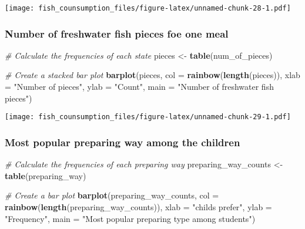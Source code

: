 \documentclass[
]{article}
\newenvironment{Shaded}{\begin{snugshade}}{\end{snugshade}}
\newcommand{\AttributeTok}[1]{\textcolor[rgb]{0.13,0.29,0.53}{#1}}
\newcommand{\CommentTok}[1]{\textcolor[rgb]{0.56,0.35,0.01}{\textit{#1}}}
\newcommand{\FunctionTok}[1]{\textcolor[rgb]{0.13,0.29,0.53}{\textbf{#1}}}
\newcommand{\NormalTok}[1]{#1}
\newcommand{\OtherTok}[1]{\textcolor[rgb]{0.56,0.35,0.01}{#1}}
\newcommand{\StringTok}[1]{\textcolor[rgb]{0.31,0.60,0.02}{#1}}
\begin{document}
\texttt{[image: fish\_counsumption\_files/figure-latex/unnamed-chunk-28-1.pdf]}

\hypertarget{number-of-freshwater-fish-pieces-foe-one-meal}{%
\subsubsection{Number of freshwater fish pieces foe one
meal}\label{number-of-freshwater-fish-pieces-foe-one-meal}}

\begin{Shaded}
\begin{Highlighting}[]
\CommentTok{\# Calculate the frequencies of each state}
\NormalTok{pieces }\OtherTok{\textless{}{-}} \FunctionTok{table}\NormalTok{(num\_of\_pieces)}

\CommentTok{\# Create a stacked bar plot}
\FunctionTok{barplot}\NormalTok{(pieces, }\AttributeTok{col =} \FunctionTok{rainbow}\NormalTok{(}\FunctionTok{length}\NormalTok{(pieces)), }
        \AttributeTok{xlab =} \StringTok{"Number of pieces"}\NormalTok{, }\AttributeTok{ylab =} \StringTok{"Count"}\NormalTok{, }\AttributeTok{main =} \StringTok{"Number of freshwater fish pieces"}\NormalTok{)}
\end{Highlighting}
\end{Shaded}

\texttt{[image: fish\_counsumption\_files/figure-latex/unnamed-chunk-29-1.pdf]}

\hypertarget{most-popular-preparing-way-among-the-children}{%
\subsubsection{Most popular preparing way among the
children}\label{most-popular-preparing-way-among-the-children}}

\begin{Shaded}
\begin{Highlighting}[]
\CommentTok{\# Calculate the frequencies of each preparing way}
\NormalTok{preparing\_way\_counts }\OtherTok{\textless{}{-}} \FunctionTok{table}\NormalTok{(preparing\_way)}

\CommentTok{\# Create a bar plot}
\FunctionTok{barplot}\NormalTok{(preparing\_way\_counts, }\AttributeTok{col =} \FunctionTok{rainbow}\NormalTok{(}\FunctionTok{length}\NormalTok{(preparing\_way\_counts)), }
        \AttributeTok{xlab =} \StringTok{"child\textquotesingle{}s prefer"}\NormalTok{, }\AttributeTok{ylab =} \StringTok{"Frequency"}\NormalTok{, }\AttributeTok{main =} \StringTok{"Most popular preparing type among students"}\NormalTok{)}
\end{Highlighting}
\end{Shaded}
\end{document}
